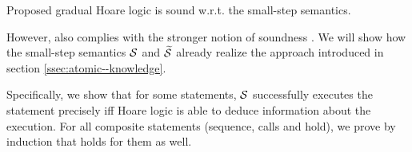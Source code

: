 Proposed gradual Hoare logic is sound w.r.t. the small-step semantics.

However, \gvlidf also complies with the stronger notion of soundness .
We will show how the small-step semantics $\mathcal{S}$ and $\widetilde{\mathcal{S}}$ already realize the approach introduced in section \ref{ssec:atomic--knowledge}.

Specifically, we show that for some statements, $\mathcal{S}$ successfully executes the statement precisely iff Hoare logic is able to deduce information about the execution.
For all composite statements (sequence, calls and hold), we prove by induction that  holds for them as well.

